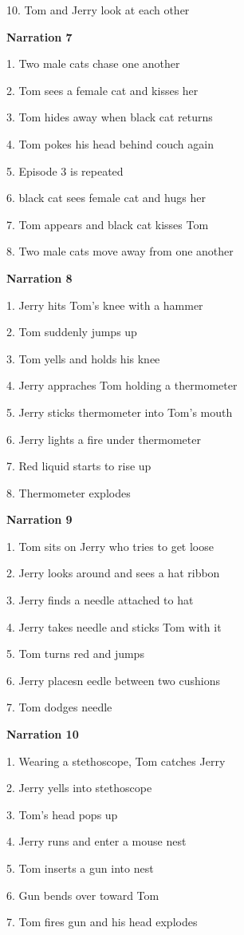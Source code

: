 \documentclass[review]{elsarticle} %
\begin{document}
10. Tom and Jerry look at each other

\textbf{Narration 7}

1. Two male cats chase one another

2. Tom sees a female cat and kisses her

3. Tom hides away when black cat returns

4. Tom pokes his head behind couch again

5. Episode 3 is repeated

6. black cat sees female cat and hugs her

7. Tom appears and black cat kisses Tom

8. Two male cats move away from one another

\textbf{Narration 8}

1. Jerry hits Tom's knee with a hammer

2. Tom suddenly jumps up

3. Tom yells and holds his knee

4. Jerry appraches Tom holding a thermometer

5. Jerry sticks thermometer into Tom's mouth

6. Jerry lights a fire under thermometer

7. Red liquid starts to rise up

8. Thermometer explodes

\textbf{Narration 9}

1. Tom sits on Jerry who tries to get loose

2. Jerry looks around and sees a hat ribbon

3. Jerry finds a needle attached to hat

4. Jerry takes needle and sticks Tom with it

5. Tom turns red and jumps

6. Jerry placesn eedle between two cushions

7. Tom dodges needle

\textbf{Narration 10}

1. Wearing a stethoscope, Tom catches Jerry

2. Jerry yells into stethoscope

3. Tom's head pops up

4. Jerry runs and enter a mouse nest

5. Tom inserts a gun into nest

6. Gun bends over toward Tom

7. Tom fires gun and his head explodes
\end{document}
